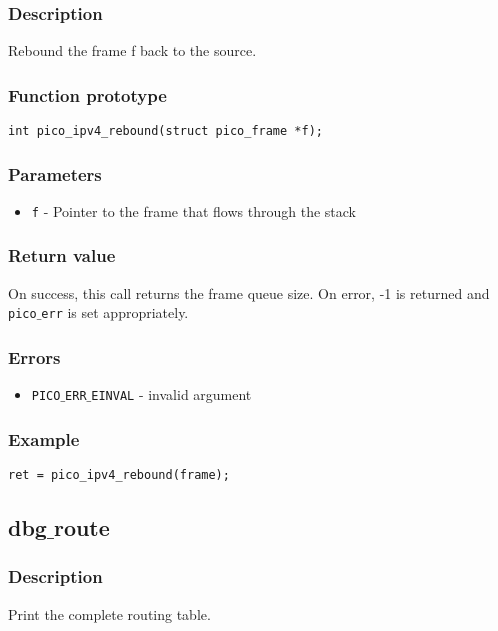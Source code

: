 \subsubsection*{Description}
Rebound the frame f back to the source.

\subsubsection*{Function prototype}
\begin{verbatim}
int pico_ipv4_rebound(struct pico_frame *f);
\end{verbatim}

\subsubsection*{Parameters}
\begin{itemize}[noitemsep]
\item \texttt{f} - Pointer to the frame that flows through the stack
\end{itemize}

\subsubsection*{Return value}
On success, this call returns the frame queue size.
On error, -1 is returned and \texttt{pico$\_$err} is set appropriately.

\subsubsection*{Errors}
\begin{itemize}[noitemsep]
\item \texttt{PICO$\_$ERR$\_$EINVAL} - invalid argument
\end{itemize}

\subsubsection*{Example}
\begin{verbatim}
ret = pico_ipv4_rebound(frame);
\end{verbatim}



\subsection{dbg$\_$route}

\subsubsection*{Description}
Print the complete routing table. 

